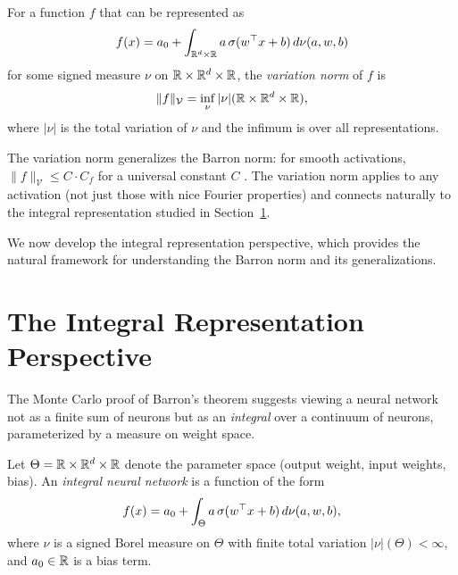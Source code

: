 \documentclass[11pt,a4paper]{article}
\begin{document}
\begin{definition}
\label{def:variation-norm}
For a function $f$ that can be represented as
\[
  f(x) = a_0 + \int_{\mathbb{R}^d \times \mathbb{R}} a \, \sigma(w^\top x + b)
  \, d\nu(a, w, b)
\]
for some signed measure $\nu$ on $\mathbb{R} \times \mathbb{R}^d \times \mathbb{R}$, the
\emph{variation norm} of $f$ is
\[
  \|f\|_{\mathcal{V}} = \inf_{\nu} |\nu|(\mathbb{R} \times \mathbb{R}^d \times \mathbb{R}),
\]
where $|\nu|$ is the total variation of $\nu$ and the infimum is over
all representations.
\end{definition}

\begin{remark}
\label{rem:variation-barron}
The variation norm generalizes the Barron norm: for smooth activations,
$\|f\|_{\mathcal{V}} \le C \cdot C_f$ for a universal constant $C$
\citep[Chapter 7]{bach2024}.  The variation norm applies to any
activation (not just those with nice Fourier properties) and connects
naturally to the integral representation studied in
Section~\ref{sec:integral}.
\end{remark}

We now develop the integral representation perspective, which provides
the natural framework for understanding the Barron norm and its
generalizations.

\section{The Integral Representation Perspective}
\label{sec:integral}

The Monte Carlo proof of Barron's theorem suggests viewing a neural
network not as a finite sum of neurons but as an \emph{integral} over a
continuum of neurons, parameterized by a measure on weight space.

\begin{definition}
\label{def:integral-rep}
Let $\Theta = \mathbb{R} \times \mathbb{R}^d \times \mathbb{R}$ denote the parameter space (output
weight, input weights, bias).  An \emph{integral neural network} is a
function of the form
\begin{equation}
\label{eq:integral-nn}
  f(x) = a_0 + \int_{\Theta} a \, \sigma(w^\top x + b) \,
  d\nu(a, w, b),
\end{equation}
where $\nu$ is a signed Borel measure on $\Theta$ with finite total
variation $|\nu|(\Theta) < \infty$, and $a_0 \in \mathbb{R}$ is a bias term.
\end{definition}
\end{document}
